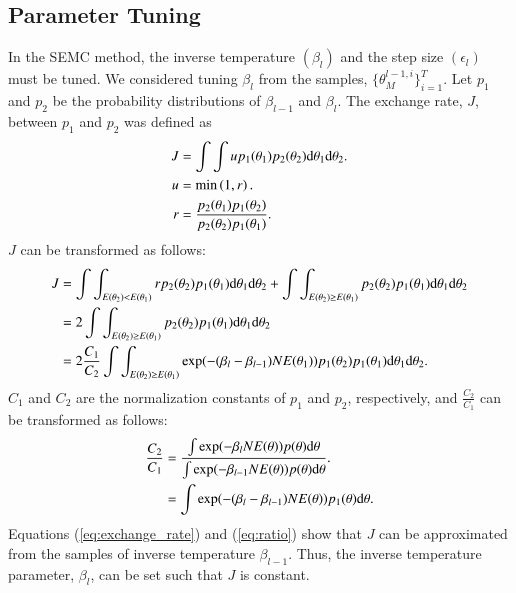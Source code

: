 \documentclass[12pt]{article}
\begin{document}
\subsection{Parameter Tuning}
In the SEMC method, the inverse temperature $(\beta_l)$ and the step size $(\epsilon_l)$ must be tuned.
We considered tuning $\beta_l$ from the samples, $\{\theta_M^{l-1,i}\}_{i=1}^T$.
Let $p_1$ and $p_2$ be the probability distributions of $\beta_{l-1}$ and $\beta_l$.
The exchange rate, $J$, between $p_1$ and $p_2$ was defined as
\begin{align}
    J &= \int \int u p_1(\theta_1)p_2(\theta_2)\textup{d}\theta_1 \textup{d}\theta_2. \\
    u &= \min\left(1, r\right). \\
    r &= \dfrac{p_2(\theta_1)p_1(\theta_2)}{p_2(\theta_2)p_1(\theta_1)}.
\end{align}
$J$ can be transformed as follows:
\begin{align}
    J &= \int\int_{E(\theta_2) < E(\theta_1)} r p_2(\theta_2)p_1(\theta_1)\textup{d}\theta_1 \textup{d}\theta_2  + \int\int_{E(\theta_2) \geq E(\theta_1)} p_2(\theta_2)p_1(\theta_1)\textup{d}\theta_1 \textup{d}\theta_2 \\ 
    &= 2\int\int_{E(\theta_2) \geq E(\theta_1)} p_2(\theta_2)p_1(\theta_1)\textup{d}\theta_1 \textup{d}\theta_2 \\
    &= 2\frac{C_1}{C_2}\int\int_{E(\theta_2) \geq E(\theta_1)} \exp(-(\beta_l - \beta_{l-1})NE(\theta_1))p_1(\theta_2)p_1(\theta_1)\textup{d}\theta_1 \textup{d}\theta_2.
    \label{eq:exchange_rate}
\end{align}
$C_1$ and $C_2$ are the normalization constants of $p_1$ and $p_2$, respectively, and $\frac{C_2}{C_1}$ can be transformed as follows:
\begin{align}
    \frac{C_2}{C_1} &= \frac{\int \exp(-\beta_{l}NE(\theta))p(\theta)\textup{d}\theta}{\int \exp(-\beta_{l-1}NE(\theta))p(\theta)\textup{d}\theta}. \\
    &= \int \exp(-(\beta_{l} - \beta_{l-1})NE(\theta))p_1(\theta)\textup{d}\theta.
    \label{eq:ratio}
\end{align}
Equations (\ref{eq:exchange_rate}) and (\ref{eq:ratio}) show that $J$ can be approximated from the samples of inverse temperature $\beta_{l-1}$.
Thus, the inverse temperature parameter, $\beta_l$, can be set such that $J$ is constant. \par
\end{document}
